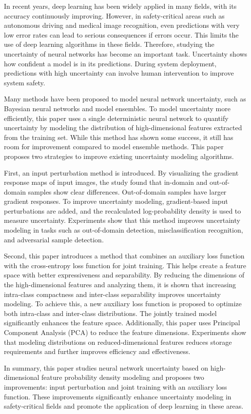 \documentclass[type=master,twoside]{fduthesis}
\begin{document}
\begin{abstract*}
In recent years, deep learning has been widely applied in many fields, with its accuracy continuously improving. However, in safety-critical areas such as autonomous driving and medical image recognition, even predictions with very low error rates can lead to serious consequences if errors occur. This limits the use of deep learning algorithms in these fields. Therefore, studying the uncertainty of neural networks has become an important task. Uncertainty shows how confident a model is in its predictions. During system deployment, predictions with high uncertainty can involve human intervention to improve system safety.

Many methods have been proposed to model neural network uncertainty, such as Bayesian neural networks and model ensembles. To model uncertainty more efficiently, this paper uses a single deterministic neural network to quantify uncertainty by modeling the distribution of high-dimensional features extracted from the training set. While this method has shown some success, it still has room for improvement compared to model ensemble methods. This paper proposes two strategies to improve existing uncertainty modeling algorithms.

First, an input perturbation method is introduced. By visualizing the gradient response maps of input images, the study found that in-domain and out-of-domain samples show clear differences. Out-of-domain samples have larger gradient responses. To improve uncertainty modeling, gradient-based input perturbations are added, and the recalculated log-probability density is used to measure uncertainty. Experiments show that this method improves uncertainty modeling in tasks such as out-of-domain detection, misclassification recognition, and adversarial sample detection.

Second, this paper introduces a method that combines an auxiliary loss function with the cross-entropy loss function for joint training. This helps create a feature space with better expressiveness and separability. By reducing the dimensions of the high-dimensional features and analyzing them, it is shown that increasing intra-class compactness and inter-class separability improves uncertainty modeling. To achieve this, a new auxiliary loss function is proposed to optimize both intra-class and inter-class distributions. The jointly trained model significantly enhances the feature space. Additionally, this paper uses Principal Component Analysis (PCA) to reduce the feature dimensions. Experiments show that modeling distributions on reduced-dimensional features reduces storage requirements and further improves efficiency and effectiveness.

In summary, this paper studies neural network uncertainty based on high-dimensional feature probability density modeling and proposes two improvements: input perturbation and joint training with an auxiliary loss function. These improvements significantly enhance uncertainty modeling in safety-critical fields and promote the application of deep learning in these areas.
\end{abstract*}
\end{document}
